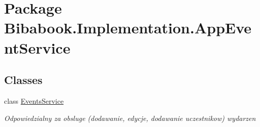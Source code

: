 \hypertarget{namespace_bibabook_1_1_implementation_1_1_app_event_service}{}\section{Package Bibabook.\+Implementation.\+App\+Event\+Service}
\label{namespace_bibabook_1_1_implementation_1_1_app_event_service}
\subsection*{Classes}
\begin{DoxyCompactItemize}
\item 
class \hyperlink{class_bibabook_1_1_implementation_1_1_app_event_service_1_1_events_service}{Events\+Service}
\begin{DoxyCompactList}\small\item\em Odpowiedzialny za obsluge (dodawanie, edycje, dodawanie uczestnikow) wydarzen \end{DoxyCompactList}\end{DoxyCompactItemize}

